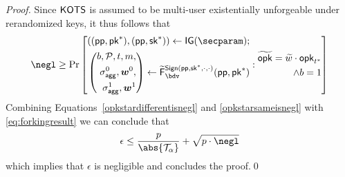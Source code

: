 \begin{proof}
Since $\mathsf{KOTS}$ is assumed to be multi-user existentially unforgeable under rerandomized keys, it thus follows that
  \begin{equation}
    \negl \geq \Pr\left[
      \begin{aligned}
      ((\params,\pk^*),(\params,\sk^*)) \gets \IG(\secparam);\\
      \left(\begin{aligned}b,\pubkeys,t,m,\\\aggsig^0,\vec{w}^0,\\\aggsig^1,\vec{w}^1\end{aligned}\right)\gets \widetilde\fork^{\sign(\params,\sk^*,\cdot,\cdot)}_\bdv(\params,\pk^*)\\
      \end{aligned}:
      \begin{aligned}
        \widetilde \opk = \widetilde w\cdot\opk_{t^*}\\
        \land b=1
      \end{aligned}
    \right]\label{opkstarsameisnegl}
  \end{equation}
  Combining Equations~\ref{opkstardifferentisnegl} and \ref{opkstarsameisnegl} with \autoref{eq:forkingresult} we can conclude that
  \[
    \epsilon \leq \frac{p}{\abs{\tern_\alpha}} + \sqrt{p\cdot\negl}
  \]
  which implies that $\epsilon$ is negligible and concludes the proof.\qed
  \fi
\end{proof}

